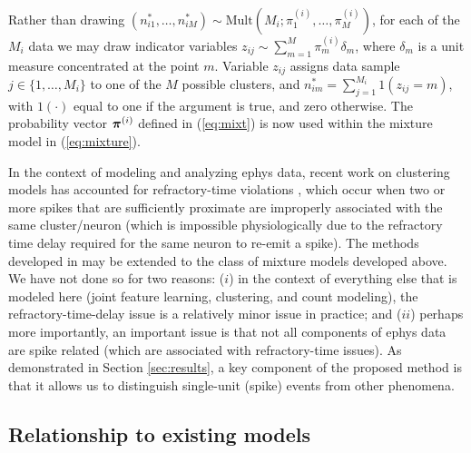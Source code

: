 \documentclass[journal]{IEEEtran}
\begin{document}
Rather than drawing $(n_{i1}^*,\dots,n_{iM}^*)\sim\mbox{Mult}(M_i;\pi_1^{(i)},\dots,\pi_M^{(i)})$, for each of the $M_i$ data we may draw indicator variables $z_{ij}\sim\sum_{m=1}^M\pi_m^{(i)}\delta_m$, where $\delta_m$ is a unit measure concentrated at the point $m$. Variable $z_{ij}$ assigns data sample $j\in\{1,\dots,M_i\}$ to one of the $M$ possible clusters, and $n_{im}^*=\sum_{j=1}^{M_i} 1(z_{ij}=m)$, with $1(\cdot)$ equal to one if the argument is true, and zero otherwise. The probability vector $\boldsymbol{\pi}^{(i)}$ defined in (\ref{eq:mixt}) is now used within the mixture model in (\ref{eq:mixture}).


In the context of modeling and analyzing ephys data, recent work on clustering models has accounted for refractory-time
violations \cite{Wood2009,Bo2011}, which occur when two or more spikes that
are sufficiently proximate are improperly associated with the same
cluster/neuron (which is impossible physiologically due to the refractory time delay
required for the same neuron to re-emit a spike). The methods developed in \cite{Wood2009,Bo2011} may be extended to the class of mixture models developed above. We have not done so for two reasons: ($i$) in the context of everything else that is modeled here (joint feature learning, clustering, and count modeling), the refractory-time-delay issue is a relatively minor issue in practice; and ($ii$) perhaps more importantly, an important issue is that not all components of ephys data are spike related (which are associated with refractory-time issues). As demonstrated in Section \ref{sec:results}, a key component of the proposed method is that it allows us to distinguish single-unit (spike) events from other phenomena.

\subsection{Relationship to existing models\label{sec:related}}
\end{document}
